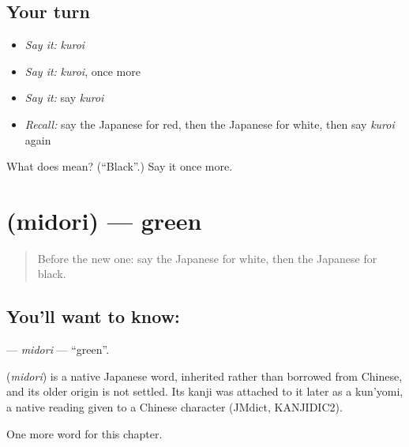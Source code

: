 \subsection*{Your turn}
\begin{itemize}
\raggedright
  \item \emph{Say it:} \emph{kuroi}
  \item \emph{Say it:} \emph{kuroi}, once more
  \item \emph{Say it:} say \emph{kuroi}
  \item \emph{Recall:} say the Japanese for red, then the Japanese for white, then say \emph{kuroi} again
\end{itemize}

\begin{tcolorbox}[breakable,colback=teal!4,colframe=teal!35!black,title={Before you move on}]
What does  mean? (\textquotedblleft{}Black\textquotedblright{}.) Say it once more.
\end{tcolorbox}
\section[\texorpdfstring{\ja{みどり} (midori)}{みどり (midori)}]{ (midori) — green}

\label{lesson:JA-C52-midori}



\begin{quote}
Before the new one: say the Japanese for white, then the Japanese for black.
\end{quote}

\subsection*{You'll want to know: }
\textbf{} — \emph{midori} — \textquotedblleft{}green\textquotedblright{}.

\begin{cousinweb}
\textbf{} (\emph{midori}) is a native Japanese word, inherited rather than borrowed from Chinese, and its older origin is not settled. Its kanji was attached to it later as a kun'yomi, a native reading given to a Chinese character (JMdict, KANJIDIC2).
\end{cousinweb}

\begin{grammarlens}[title={What you've built}]
One more word for this chapter.
\end{grammarlens}

